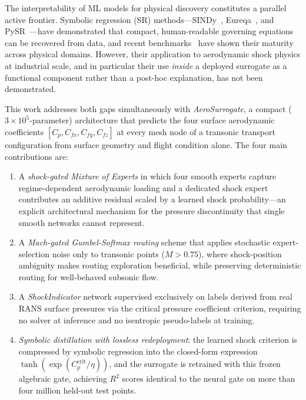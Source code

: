 \documentclass{WCCM-ECCOMAS_2026_Full_Paper}
\begin{document}
The interpretability of ML models for physical discovery constitutes
a parallel active frontier.  Symbolic regression (SR)
methods---SINDy~\cite{Brunton2016}, Eureqa~\cite{Schmidt2009}, and
PySR~\cite{Cranmer2020}---have demonstrated that compact,
human-readable governing equations can be recovered from data, and
recent benchmarks~\cite{LaCava2021,Angelis2023} have shown their
maturity across physical domains.  However, their application to
aerodynamic shock physics at industrial scale, and in particular
their use \emph{inside} a deployed surrogate as a functional
component rather than a post-hoc explanation, has not been
demonstrated.

This work addresses both gaps simultaneously with
\emph{AeroSurrogate}, a compact ($3\times 10^{5}$-parameter)
architecture that predicts the four surface aerodynamic coefficients
$[C_p, C_{fx}, C_{fy}, C_{fz}]$ at every mesh node of a transonic
transport configuration from surface geometry and flight condition
alone.  The four main contributions are:
\begin{enumerate}
  \item A \emph{shock-gated Mixture of Experts} in which four smooth
        experts capture regime-dependent aerodynamic loading and a
        dedicated shock expert contributes an additive residual scaled
        by a learned shock probability---an explicit architectural
        mechanism for the pressure discontinuity that single smooth
        networks cannot represent.
  \item A \emph{Mach-gated Gumbel-Softmax routing} scheme that applies
        stochastic expert-selection noise only to transonic points
        ($M>0.75$), where shock-position ambiguity makes routing
        exploration beneficial, while preserving deterministic routing
        for well-behaved subsonic flow.
  \item A \emph{ShockIndicator} network supervised exclusively on
        labels derived from real RANS surface pressures via the
        critical pressure coefficient criterion, requiring no solver
        at inference and no isentropic pseudo-labels at training.
  \item \emph{Symbolic distillation with lossless redeployment}: the
        learned shock criterion is compressed by symbolic regression
        into the closed-form expression
        $\tanh(\exp(C_p^{\mathrm{crit}}/\eta))$, and the surrogate is
        retrained with this frozen algebraic gate, achieving $R^{2}$
        scores identical to the neural gate on more than four million
        held-out test points.
\end{enumerate}
\end{document}
